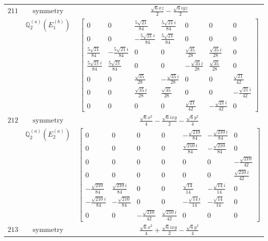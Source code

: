 \documentclass[fleqn,8pt,landscape]{jsarticle}
\begin{document}
\begin{longtable}{ccc}
$ 211 $ & $ \text{symmetry} $ & $ \frac{\sqrt{6} x z}{2} - \frac{\sqrt{6} i y z}{2} $ \\
$  $ & $ \mathbb{Q}_{2}^{(a)}(E_{1}^{(b)}) $ & $ \begin{bmatrix} 0 & 0 & \frac{5 \sqrt{21}}{84} & \frac{5 \sqrt{21} i}{84} & 0 & 0 & 0 \\ 0 & 0 & - \frac{5 \sqrt{21} i}{84} & \frac{5 \sqrt{21}}{84} & 0 & 0 & 0 \\ \frac{5 \sqrt{21}}{84} & - \frac{5 \sqrt{21} i}{84} & 0 & 0 & \frac{\sqrt{35}}{28} & \frac{\sqrt{35} i}{28} & 0 \\ \frac{5 \sqrt{21} i}{84} & \frac{5 \sqrt{21}}{84} & 0 & 0 & - \frac{\sqrt{35} i}{28} & \frac{\sqrt{35}}{28} & 0 \\ 0 & 0 & \frac{\sqrt{35}}{28} & - \frac{\sqrt{35} i}{28} & 0 & 0 & \frac{\sqrt{21}}{42} \\ 0 & 0 & \frac{\sqrt{35} i}{28} & \frac{\sqrt{35}}{28} & 0 & 0 & - \frac{\sqrt{21} i}{42} \\ 0 & 0 & 0 & 0 & \frac{\sqrt{21}}{42} & - \frac{\sqrt{21} i}{42} & 0 \end{bmatrix} $ \\ \hline
$ 212 $ & $ \text{symmetry} $ & $ \frac{\sqrt{6} x^{2}}{4} - \frac{\sqrt{6} i x y}{2} - \frac{\sqrt{6} y^{2}}{4} $ \\
$  $ & $ \mathbb{Q}_{2}^{(a)}(E_{2}^{(a)}) $ & $ \begin{bmatrix} 0 & 0 & 0 & 0 & - \frac{\sqrt{210}}{84} & - \frac{\sqrt{210} i}{84} & 0 \\ 0 & 0 & 0 & 0 & \frac{\sqrt{210} i}{84} & - \frac{\sqrt{210}}{84} & 0 \\ 0 & 0 & 0 & 0 & 0 & 0 & - \frac{\sqrt{210}}{42} \\ 0 & 0 & 0 & 0 & 0 & 0 & \frac{\sqrt{210} i}{42} \\ - \frac{\sqrt{210}}{84} & \frac{\sqrt{210} i}{84} & 0 & 0 & \frac{\sqrt{14}}{14} & - \frac{\sqrt{14} i}{14} & 0 \\ - \frac{\sqrt{210} i}{84} & - \frac{\sqrt{210}}{84} & 0 & 0 & - \frac{\sqrt{14} i}{14} & - \frac{\sqrt{14}}{14} & 0 \\ 0 & 0 & - \frac{\sqrt{210}}{42} & \frac{\sqrt{210} i}{42} & 0 & 0 & 0 \end{bmatrix} $ \\ \hline
$ 213 $ & $ \text{symmetry} $ & $ \frac{\sqrt{6} x^{2}}{4} + \frac{\sqrt{6} i x y}{2} - \frac{\sqrt{6} y^{2}}{4} $ \\

\end{longtable}
\end{document}
